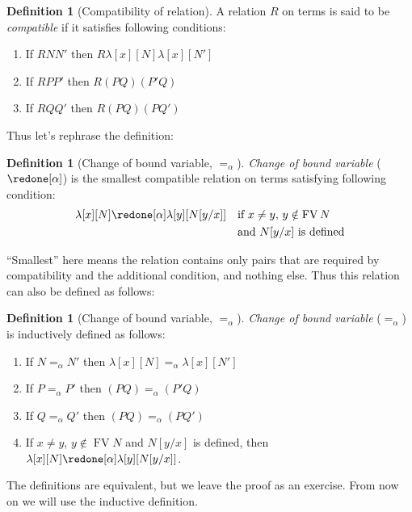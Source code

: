 \documentclass[10pt,a4paper]{article}
\theoremstyle{plain}
\theoremstyle{definition}
\newtheorem{defn}[thm]{Definition}
\theoremstyle{remark}
\newcommand*{\ollabel}[1]{\label{#1}}
\providecommand{\Subst}[3]{#1[#2/#3]}
\providecommand{\lambd}{\ensuremath{\lambda}}
\providecommand{\FV}{\operatorname{FV}}
\providecommand{\aconvone}{\mathrel{=_\alpha}}
\providecommand{\FV}{\operatorname{FV}}
\begin{document}
\begin{defn}[Compatibility of relation]
  A relation $R$ on terms is said to be \emph{compatible}
  if it satisfies following conditions:
  \begin{enumerate}
  \item If $R N N'$ then $R \lambd[x][N] \lambd[x][N']$
  \item If $R P P'$ then $R (PQ) (P'Q)$
  \item If $R Q Q'$ then $R (PQ) (PQ')$
  \end{enumerate}
\end{defn}

Thus let's rephrase the definition:
\begin{defn}[Change of bound variable, $\aconvone$]
  \emph{Change of bound variable} ($\redone[\alpha]$) is 
  the smallest compatible relation on terms satisfying following
  condition:
  \begin{align*}
    &\lambd[x][N] \redone[\alpha] \lambd[y][\Subst{N}{y}{x}] && \text{if
      $x \neq y$, $y \notin \FV{N}$} \\
    & &&\text{and $\Subst{N}{y}{x}$ is defined}
  \end{align*}
\end{defn}

``Smallest'' here means the relation contains only pairs that are required by
compatibility and the additional condition, and nothing else. Thus
this relation can also be defined as follows:

\begin{defn}[Change of bound variable, $\aconvone$] \ollabel{defn:aconvone}
  \emph{Change of bound variable} ($\aconvone$) is inductively
  defined as follows:
  \begin{enumerate}
  \item If $N \aconvone N'$ then $\lambd[x][N] \aconvone
    \lambd[x][N']$ \ollabel{defn:aconvone1}
  \item If $P \aconvone P'$ then $(PQ) \aconvone (P'Q)$ \ollabel{defn:aconvone2}
  \item If $Q \aconvone Q'$ then $(PQ) \aconvone (PQ')$ \ollabel{defn:aconvone3}
  \item If $x \neq y$, $y \notin \FV{N}$ and $\Subst{N}{y}{x}$ is defined, then
    $\lambd[x][N] \redone[\alpha] \lambd[y][\Subst{N}{y}{x}]$.
    \ollabel{defn:aconvone4}
  \end{enumerate}
\end{defn}

The definitions are equivalent, but we leave the proof as an
exercise. From now on we will use the inductive definition.
\end{document}
